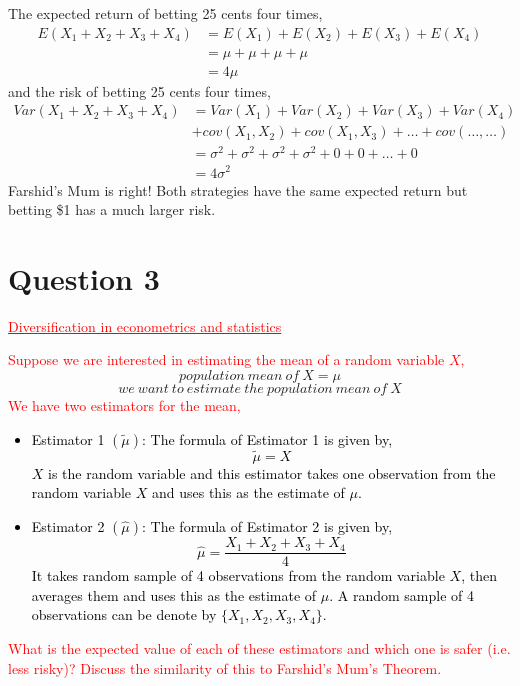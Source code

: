 \documentclass[12pt]{report}
\begin{document}
\noindent The expected return of betting 25 cents four times,
\begin{align*}
E(X_1+X_2+X_3+X_4)&=E(X_1)+E(X_2)+E(X_3)+E(X_4) \\
&=\mu+\mu+\mu+\mu \\
&=4\mu
\end{align*}
\noindent and the risk of betting 25 cents four times,
\begin{align*}
Var(X_1+X_2+X_3+X_4)&=Var(X_1)+Var(X_2)+Var(X_3)+Var(X_4) \\
&+cov(X_1,X_2)+cov(X_1,X_3)+\dots+cov(\dots,\dots)  \\
&=\sigma^2+\sigma^2+\sigma^2+\sigma^2+0+0+\dots+0 \\
&=4\sigma^2
\end{align*}
\noindent Farshid's Mum is right! Both strategies have the same expected return but betting \$1 has a much larger risk. 

\newpage
\section*{Question 3}
\textcolor{red}{\underline{Diversification in econometrics and statistics}}

\noindent \textcolor{red}{Suppose we are interested in estimating the mean of a random variable $X$,}
\noindent $$population\ mean\ of\ X = \mu$$
\noindent $$we\ want\ to\ estimate\ the\ population\ mean\ of\ X$$
\noindent \textcolor{red}{We have two estimators for the mean,}
\noindent \textcolor{black}{\begin{itemize}
		\item Estimator 1 $(\tilde{\mu})$: The formula of Estimator 1 is given by, $$\tilde{\mu} = X$$  $X$ is the random variable and this estimator takes one observation from the random variable $X$ and uses this as the estimate of $\mu$. 
		\item Estimator 2 $(\hat{\mu})$: The formula of Estimator 2 is given by, $$\hat{\mu} = \dfrac{X_1+X_2+X_3+X_4}{4}$$ It takes random sample of 4 observations from the random variable $X$, then averages them and uses this as the estimate of $\mu$. A random sample of 4 observations can be denote by $\{X_1,X_2,X_3,X_4\}$. 
\end{itemize}}
\noindent \textcolor{red}{What is the expected value of each of these estimators and which one is safer (i.e. less risky)? Discuss the similarity of this to Farshid's Mum's Theorem.}
\end{document}
